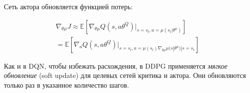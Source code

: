 Сеть актора обновляется функцией потерь:

\begin{equation}
	\label{eq:ch1-ddpg-4}
	\begin{multlined}
		\nabla_{\theta \mu} J \approx \mathbb{E}[\nabla_{\theta \mu} Q(s, a \theta^Q)|_{s=s_t,a=\mu(s_t|\theta^\mu)}] \\
		= \mathbb{E}[\nabla_a Q(s, a \theta^Q)|_{s=s_t,a=\mu(s_t) \nabla_{\theta \mu} \mu (s|\theta^\mu)|s=s_t}]
	\end{multlined}
\end{equation}

Как и в DQN, чтобы избежать расхождения, в DDPG применяется \textit{мягкое обновление} (soft update) для целевых сетей критика и актора. Они обновляются только раз в указанное количество шагов.
